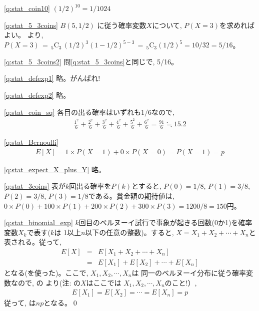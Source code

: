 %
\ref{q:stat_coin10}  $(1/2)^{10}=1/1024$
\mv

\ref{q:stat_5_3coins} $B(5, 1/2)$
に従う確率変数$X$について, $P(X=3)$を求めればよい。
より, 
$P(X=3)\,=\,_5\text{C}_3\,(1/2)^3(1-1/2)^{5-3}\,=\,_5\text{C}_3(1/2)^5=10/32=5/16$。
\mv

\ref{q:stat_5_3coins2} 問\ref{q:stat_5_3coins}と同じで, 5/16。
\mv

\ref{q:stat_defexp1} 略。がんばれ!
\mv

\ref{q:stat_defexp2} 略。
\mv

%
\ref{q:stat_coin_sq}  各目の出る確率はいずれも$1/6$なので, \
\begin{eqnarray*}
\frac{1^2}{6} + \frac{2^2}{6} + \frac{3^2}{6} + \frac{4^2}{6} + \frac{5^2}{6} + \frac{6^2}{6} = \frac{91}{6} \fallingdotseq 15.2
\end{eqnarray*}
\mv

\ref{q:stat_Bernoulli}
\begin{eqnarray*}
E[X]=1\times P(X=1)+0\times P(X=0)=P(X=1)=p
\end{eqnarray*}
\mv

\ref{q:stat_expect_X_plus_Y} 略。
\mv

%
\ref{q:stat_3coins}  表が$k$回出る確率を$P(k)$とすると, $P(0)=1/8$, $P(1)=3/8$, $P(2)=3/8$, $P(3)=1/8$である。賞金額の期待値は, $0\times P(0)+100\times P(1)+200\times P(2)+300\times P(3)=1200/8=150\text{円}$。
\mv


\ref{q:stat_binomial_exp} 
$k$回目のベルヌーイ試行で事象が起きる回数(0か1)を確率変数$X_k$で表す($k$は
1以上$n$以下の任意の整数)。すると, $X=X_1+X_2+\cdots+X_n$と
表される。従って, 
\begin{eqnarray}
E[X]&=&E[X_1+X_2+\cdots+X_n]\nonumber\\
&=&E[X_1]+E[X_2]+\cdots+E[X_n]\label{q:stat_binomial_exp_ans8}
\end{eqnarray}
となる(を使った)。ここで, $X_1, X_2, \cdots, X_n$は
同一のベルヌーイ分布に従う確率変数なので, の
より{\small (注: の$X$はここでは
$X_1, X_2, \cdots, X_n$のこと!）}, 
\begin{eqnarray}
E[X_1]=E[X_2]=\cdots=E[X_n]=p\label{q:stat_binomial_exp_ans4}
\end{eqnarray}
従って, は$np$となる。\qed
\mv

